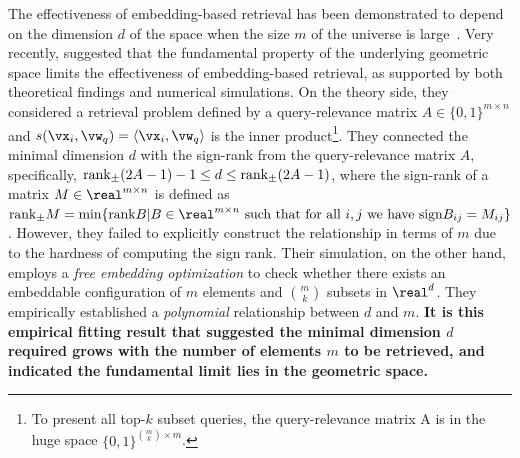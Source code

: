 The effectiveness of embedding-based retrieval has been demonstrated to depend on the dimension $d$ of the space when the size $m$ of the universe is large~\citep{yin2018dimensionality,reimers2021curse}. Very recently, \citet{weller2025theoretical} suggested that the fundamental property of the underlying geometric space limits the effectiveness of embedding-based retrieval, as supported by both theoretical findings and numerical simulations. On the theory side, they considered a retrieval problem defined by a query-relevance matrix $A\in \{0, 1\}^{m\times n}$ and $s(\vx_i, \vw_q) = \langle \vx_i, \vw_q \rangle$ is the inner product\footnote{To present all top-$k$ subset queries, the query-relevance matrix A  is in the huge space $\{0,1\}^{\binom{m}{k} \times m}$.}. They connected the minimal dimension $d$ with the sign-rank from the query-relevance matrix $A$, specifically, ${\rm rank}_{\pm} (2A-1) - 1 \leq d \leq {\rm rank}_{\pm} (2A-1) $, where the sign-rank of a matrix $M\in \real^{m\times n}$ is defined as ${\rm rank}_{\pm} M = \min\{{\rm rank} B | B\in \real^{m\times n} \text{ such that for all } i, j \text{ we have } {\rm sign}B_{ij} = M_{ij}\}$. However, they failed to explicitly construct the relationship in terms of $m$ due to the hardness of computing the sign rank.
Their simulation, on the other hand, employs a \textit{free embedding optimization} to check whether there exists an embeddable configuration of $m$ elements and $\binom{m}{k}$ subsets in $\real^d$. They empirically established a \textit{polynomial} relationship between $d$ and $m$. \textbf{It is this empirical fitting result that suggested the minimal dimension $d$ required grows with the number of elements $m$ to be retrieved, and indicated the fundamental limit lies in the geometric space.}


